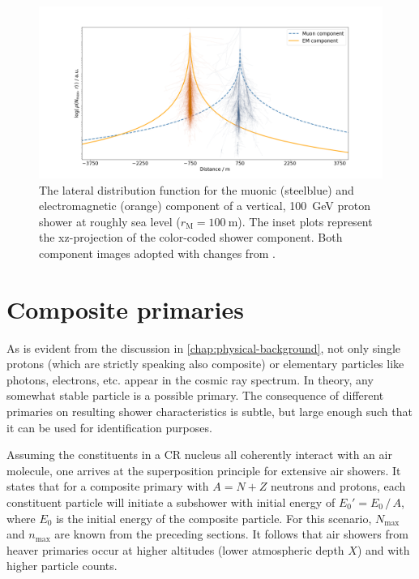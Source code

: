 \begin{figure}
	\centering
	\includegraphics[width=1.0\textwidth]{./plots/componentwise_LDF.png}
	\caption{The lateral distribution function for the muonic (steelblue) and electromagnetic (orange) component of a vertical, \SI{100}{\giga\electronvolt}
	proton shower at roughly sea level ($r_\text{M}=\SI{100}{\meter}$). The inset plots represent the xz-projection of the color-coded shower component. Both 
	component images adopted with changes from \cite{CorsikaShower}.}
	\label{fig:component-LDF}
\end{figure}

\section{Composite primaries}
\label{sec:superposition-principle}

As is evident from the discussion in \autoref{chap:physical-background}, not only single protons (which are strictly speaking also composite) or elementary 
particles like photons, electrons, etc. appear in the cosmic ray spectrum. In theory, any somewhat stable particle is a possible primary. The consequence of 
different primaries on resulting shower characteristics is subtle, but large enough such that it can be used for identification purposes.

Assuming the constituents in a CR nucleus all coherently interact with an air molecule, one arrives at the superposition principle for extensive air showers. It 
states that for a composite primary with $A = N + Z$ neutrons and protons, each constituent particle will initiate a subshower with initial energy of 
$E_0' = E_0\,/\,A$, where $E_0$ is the initial energy of the composite particle. For this scenario, $N_\text{max}$ and $n_\text{max}$ are known from the preceding
sections. It follows that air showers from heaver primaries occur at higher altitudes (lower atmospheric depth $X$) and with higher particle counts.

